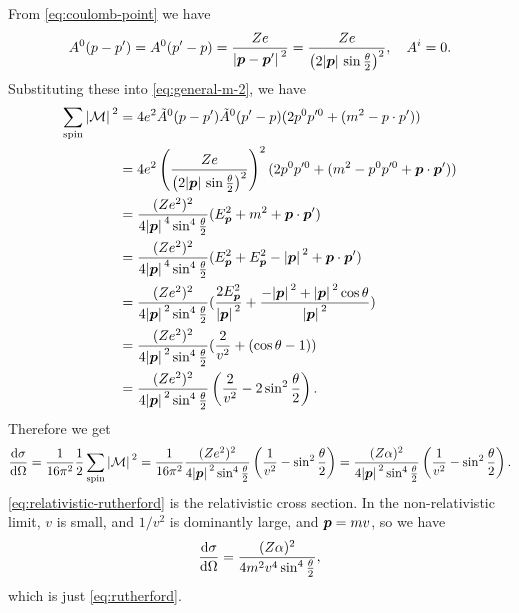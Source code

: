 \documentclass[hyperref, a4paper]{article}
\begin{document}
\begin{itemize}
From \eqref{eq:coulomb-point} we have 
\[
    A^0(p - p') = A^0(p' - p) = \frac{Ze}{ \abs*{\vb*{p} - \vb*{p}'}^2} = \frac{Ze}{ \left( 2 \abs*{\vb*{p}} \sin \frac{\theta}{2} \right)^2}, \quad A^i = 0.
\]
Substituting these into \eqref{eq:general-m-2}, we have 
\[
    \begin{aligned}
        \sum_\text{spin} \abs*{\mathcal{M}}^2 &= 4 e^2 \tilde{A}^0(p - p') \tilde{A}^0(p' - p) (2 p^0 p'^0 + (m^2 - p \cdot p') ) \\
        &= 4 e^2 \left( \frac{Ze}{ \left( 2 \abs*{\vb*{p}} \sin \frac{\theta}{2} \right)^2} \right)^2 (2 p^0 p'^0 + (m^2 - p^0 p'^0 + \vb*{p} \cdot \vb*{p}') ) \\
        &= \frac{(Z e^2)^2}{4 \abs*{\vb*{p}}^4 \sin^4 \frac{\theta}{2} } (E_{\vb*{p}}^2 + m^2 + \vb*{p} \cdot \vb*{p}') \\
        &= \frac{(Z e^2)^2}{4 \abs*{\vb*{p}}^4 \sin^4 \frac{\theta}{2} } (E_{\vb*{p}}^2 + E_{\vb*{p}}^2 - \abs*{\vb*{p}}^2 + \vb*{p} \cdot \vb*{p}') \\
        &= \frac{(Z e^2)^2}{4 \abs*{\vb*{p}}^2  \sin^4 \frac{\theta}{2} } ( \frac{2 E_{\vb*{p}}^2}{\abs*{\vb*{p}}^2} + \frac{- \abs*{\vb*{p}}^2 + \abs*{\vb*{p}}^2 \cos \theta }{\abs*{\vb*{p}}^2} ) \\
        &= \frac{(Z e^2)^2}{4 \abs*{\vb*{p}}^2 \sin^4 \frac{\theta}{2} } ( \frac{2}{v^2} + (\cos \theta - 1) ) \\
        &=  \frac{(Z e^2)^2}{4 \abs*{\vb*{p}}^2 \sin^4 \frac{\theta}{2} } \left( \frac{2}{v^2} - 2 \sin^2 \frac{\theta}{2} \right). 
    \end{aligned}
\]
Therefore we get 
\begin{equation}
    \dv{\sigma}{\Omega} = \frac{1}{16 \pi^2} \frac{1}{2} \sum_\text{spin} \abs*{\mathcal{M}}^2 = \frac{1}{16 \pi^2} \frac{(Z e^2)^2}{ 4 \abs*{\vb*{p}}^2 \sin^4 \frac{\theta}{2} } \left( \frac{1}{v^2} - \sin^2 \frac{\theta}{2} \right) = \frac{(Z \alpha)^2}{4 \abs*{\vb*{p}}^2 \sin^4 \frac{\theta}{2}} \left( \frac{1}{v^2} - \sin^2 \frac{\theta}{2} \right).
    \label{eq:relativistic-rutherford}
\end{equation}
\eqref{eq:relativistic-rutherford} is the relativistic cross section. In the non-relativistic limit, $v$ is small,
and $1 / v^2$ is dominantly large, and $\vb*{p} = mv$, so we have 
\begin{equation}
    \dv{\sigma}{\Omega} = \frac{(Z \alpha)^2}{ 4 m^2 v^4 \sin^4 \frac{\theta}{2} },
\end{equation}
which is just \eqref{eq:rutherford}.

\end{itemize}
\end{document}
